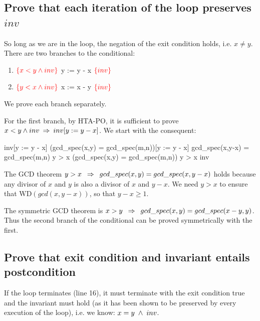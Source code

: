 \documentclass[runningheads,12pt]{article}
\def\WD{\textrm{WD}}
\def\assert#1{\textcolor{red}{ {\{} {#1} {\}}}}
\begin{document}
	
\subsection{Prove that each iteration of the loop preserves $inv$}

So long as we are in the loop, the negation of the exit condition holds, i.e. $x \neq y$. There are two branches to the conditional:

\begin{enumerate}
  \item $\assert{ x < y \land inv}$ y := y - x $\assert{ inv}$
  \item $\assert{ y < x \land inv}$ x := x - y $\assert{ inv}$
\end{enumerate}

\noindent We prove each branch separately. 

For the first branch, by HTA-PO, it is sufficient to prove $x < y \land inv \; \mathbin\Rightarrow \; inv[y := y - x]$. We start with the consequent:
		
\begin{calculation}
	inv[y := y - x]
	(gcd\_spec(x,y) \1= gcd\_spec(m,n))[y := y - x]
	gcd\_spec(x,y-x) \1= gcd\_spec(m,n)
	y > x \limp (gcd\_spec(x,y) \1= gcd\_spec(m,n))
	y > x \1\limp inv \qquad\blacksquare
\end{calculation}

The GCD theorem $y > x \; \; \mathbin\Rightarrow \; \; gcd\_spec(x,y) = gcd\_spec(x,y-x)$ holds because any divisor of $x$ and $y$ is also a divisor of $x$ and $y-x$. We need $y > x$ to ensure that $\WD(gcd(x,y-x))$, so that $y-x \geq 1$.

The symmetric GCD theorem is $x > y \; \; \mathbin\Rightarrow \; \; gcd\_spec(x,y) = gcd\_spec(x-y,y)$. Thus the second branch of the conditional can be proved symmetrically with the first. 


\subsection{Prove that exit condition and invariant entails postcondition} 

If the loop terminates (line 16), it must terminate with the exit condition true and the invariant must hold (as it has been shown to be preserved by every execution of the loop), i.e. we know: $x = y \; \land \; inv$.
\end{document}
